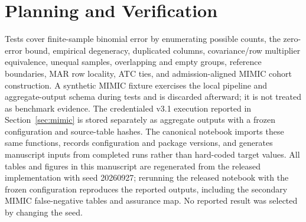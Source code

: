 \documentclass[twoside,11pt]{article}
\begin{document}
\section{Planning and Verification}
\begin{table}[ht]
\centering\small
\caption{Conservative assurance-sample planning for a Hoeffding additive width at most the
stated margin, with $\alpha=.05$. This is not a guarantee of a particular recall.}
\label{tab:planning}
\end{table}
Tests cover finite-sample binomial error by enumerating possible counts, the zero-error
bound, empirical degeneracy, duplicated columns, covariance/row multiplier equivalence,
unequal samples, overlapping and empty groups, reference boundaries, MAR row locality,
ATC ties, and admission-aligned MIMIC cohort construction. A synthetic MIMIC fixture exercises
the local pipeline and aggregate-output schema during tests and is discarded afterward; it is
not treated as benchmark evidence. The credentialed v3.1 execution reported in
Section~\ref{sec:mimic} is stored separately as aggregate outputs with a frozen configuration
and source-table hashes. The canonical notebook imports these same functions, records
configuration and package versions, and generates manuscript inputs from completed runs rather
than hard-coded target values. All tables and figures in this manuscript are regenerated from the
released implementation with seed 20260927; rerunning the released notebook with the
frozen configuration reproduces the reported outputs, including the secondary MIMIC
false-negative tables and assurance map. No reported result was selected by changing the seed.


\end{document}
